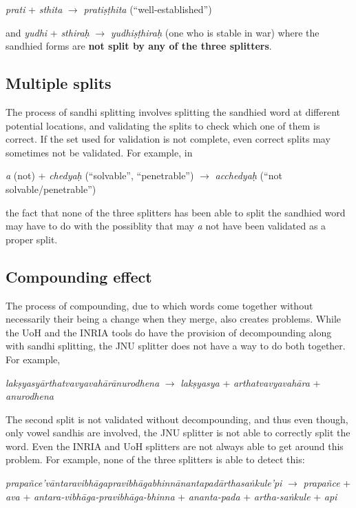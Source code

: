 \documentclass[11pt]{article}
\begin{document}
                    \textit{prati} + \textit{sthita} $\rightarrow$ \textit{pratiṣṭhita} (``well-established'')
                     
                     
and   \textit{yudhi} + \textit{sthiraḥ} $\rightarrow$ \textit{yudhiṣṭhiraḥ}  (one who is stable in war)
where the sandhied forms are \textbf{not split by any of the three splitters}.


\subsection{Multiple splits} 
The process of sandhi splitting involves splitting the sandhied word at different potential locations, and validating the splits to check which one of them is correct. If the set used for validation is not complete, even correct splits may sometimes not be validated. For example, in 

   \textit{a} (not) + \textit{chedyaḥ} (``solvable'', ``penetrable'') $\rightarrow$ \textit{acchedyaḥ} (``not solvable/penetrable'')
   
the fact that none of the three splitters has been able to split the sandhied word may have to do with the possiblity that may \textit{a} not have been validated as a proper split.


\subsection{Compounding effect}
The process of compounding, due to which words come together without necessarily their being a change when they merge, also creates problems. While the UoH and the INRIA tools do have the provision of decompounding along with sandhi splitting, the JNU splitter does not have a way to do both together.
For example,

\textit{lakṣyasyārthatvavyavahārānurodhena} $\rightarrow$  \textit{lakṣyasya} + \textit{arthatvavyavahāra} + \textit{anurodhena} 

The second split is not validated without decompounding, and thus even though, only vowel sandhis are involved, the JNU splitter is not able to correctly split the word.  
Even the INRIA and UoH splitters are not always able to get around this problem.
For example, none of the three splitters is able to detect this:

\textit{prapañce'vāntaravibhāgapravibhāgabhinnānantapadārthasaṅ‌kule'pi} $\rightarrow$ \textit{prapañce} + \textit{ava} + \textit{antara-vibhāga-pravibhāga-bhinna} + \textit{ananta-pada} + \textit{artha-saṅ‌kule} + \textit{api}
\end{document}
